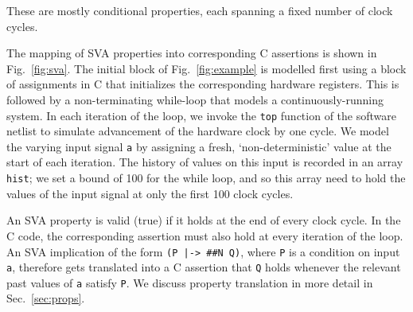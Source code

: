 \noindent These are mostly conditional properties, each spanning a fixed number of clock cycles. 
 
The mapping of SVA properties into corresponding C assertions is shown in Fig.\ \ref{fig:sva}. The initial block of Fig.\ \ref{fig:example} is modelled first using a block of assignments in C that initializes the corresponding hardware registers.  This is followed by a non-terminating while-loop that models a continuously-running system. In each iteration of the loop, we invoke the \texttt{top} function of the software netlist to simulate advancement of the hardware clock by one cycle.   We model the varying input signal \texttt{a} by assigning a fresh, `non-deterministic' value at the start of each iteration. The history of values on this input is recorded in an array \texttt{hist}; we set a bound of 100 for the while loop, and so this array need to hold the values of the input signal at only the first 100 clock cycles. 

An SVA property is valid (true) if it holds at the end of every clock cycle. In the C code, the corresponding assertion must also hold at every iteration of the loop. An SVA implication of the form \texttt{(P |-> \#\#N Q)}, where \texttt{P} is a condition on input \texttt{a}, therefore gets translated into a C assertion that \texttt{Q} holds whenever the relevant past values of \texttt{a} satisfy \texttt{P}. We discuss property translation in more detail in Sec.\ \ref{sec:props}.

